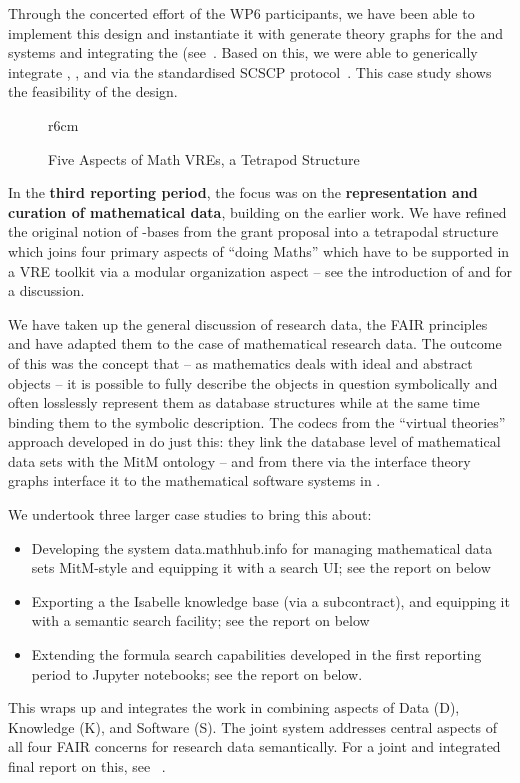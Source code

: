 Through the concerted effort of the WP6 participants, we have been able to implement this design and instantiate it with generate theory graphs for the \GAP and \Sage systems and integrating the \LMFDB (see~\cite{ODK-D6.5}.
Based on this, we were able to generically integrate \GAP, \Sage, and \LMFDB via the standardised SCSCP protocol~\cite{HorRoz:ossp09}. This case study shows the feasibility of the design. 

\begin{wrapfigure}r{6cm}\vspace*{-1em}
\vspace*{.5em}
\caption{Five Aspects of Math VREs, a Tetrapod Structure}\label{fig:tetrapod}\vspace*{-1.5em}
\end{wrapfigure}
In the \textbf{third reporting period}, the focus was on the \textbf{representation and curation of mathematical data}, building on the earlier work. We have refined the original notion of \DKS-bases from the grant proposal into a tetrapodal structure which joins four primary aspects of ``doing Maths'' which have to be supported in a VRE toolkit via a modular organization aspect -- see the introduction  of \cite{ODK-D6.10} and \cite{CarFarKohRab:bmobb19} for a discussion.

We have taken up the general discussion of research data, the FAIR principles and have adapted them to the case of mathematical research data. The outcome of this was the concept that -- as mathematics deals with ideal and abstract objects -- it is possible to fully describe the objects in question symbolically and often losslessly represent them as database structures while at the same time binding them to the symbolic description. The codecs from the ``virtual theories'' approach developed in  do just this: they link the database level of mathematical data sets with the MitM ontology -- and from there via the interface theory graphs interface it to the mathematical software systems in \pn.

We undertook three larger case studies to bring this about:
\begin{itemize}
\item Developing the system data.mathhub.info for managing mathematical data sets MitM-style and equipping it with a search UI; see the report on  below
\item Exporting a the Isabelle knowledge base (via a subcontract), and equipping it with a semantic search facility;  see the report on  below 
\item Extending the formula search capabilities developed in the first reporting period to Jupyter notebooks; see the report on
  below.
\end{itemize}
This wraps up and integrates the work in  combining aspects of Data (D), Knowledge (K), and Software (S). The joint system addresses central aspects of all four FAIR concerns for research data semantically. 
For a joint and integrated final report on this, see ~\cite{ODK-D6.10}.


